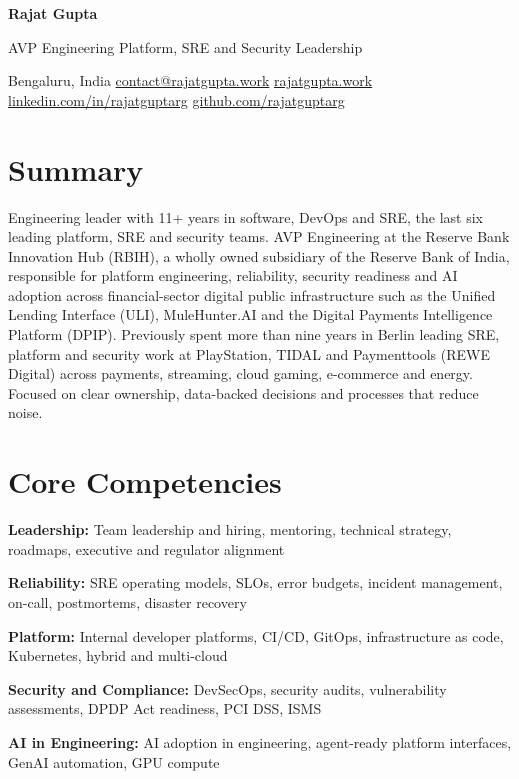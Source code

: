 \documentclass[10pt,a4paper]{article}
\newcommand{\skill}[2]{\textbf{#1:} #2\par\addvspace{0.25ex}}
\begin{document}
\begin{center}
  {\fontsize{24}{28}\selectfont\bfseries Rajat Gupta}\par\addvspace{0.6ex}
  {\large AVP Engineering \textbar{} Platform, SRE and Security Leadership}\par\addvspace{0.7ex}
  {\small
    Bengaluru, India \textbar{}
    \href{mailto:contact@rajatgupta.work}{contact@rajatgupta.work} \textbar{}
    \href{https://rajatgupta.work}{rajatgupta.work} \textbar{}
    \href{https://www.linkedin.com/in/rajatguptarg/}{linkedin.com/in/rajatguptarg} \textbar{}
    \href{https://github.com/rajatguptarg}{github.com/rajatguptarg}\par}
\end{center}

\section{Summary}
Engineering leader with 11+ years in software, DevOps and SRE, the last six leading platform, SRE and security teams.
AVP Engineering at the Reserve Bank Innovation Hub (RBIH), a wholly owned subsidiary of the Reserve Bank of India, responsible for platform engineering, reliability, security readiness and AI adoption across financial-sector digital public infrastructure such as the Unified Lending Interface (ULI), MuleHunter.AI and the Digital Payments Intelligence Platform (DPIP).
Previously spent more than nine years in Berlin leading SRE, platform and security work at PlayStation, TIDAL and Paymenttools (REWE Digital) across payments, streaming, cloud gaming, e-commerce and energy.
Focused on clear ownership, data-backed decisions and processes that reduce noise.

\section{Core Competencies}
\skill{Leadership}{Team leadership and hiring, mentoring, technical strategy, roadmaps, executive and regulator alignment}
\skill{Reliability}{SRE operating models, SLOs, error budgets, incident management, on-call, postmortems, disaster recovery}
\skill{Platform}{Internal developer platforms, CI/CD, GitOps, infrastructure as code, Kubernetes, hybrid and multi-cloud}
\skill{Security and Compliance}{DevSecOps, security audits, vulnerability assessments, DPDP Act readiness, PCI DSS, ISMS}
\skill{AI in Engineering}{AI adoption in engineering, agent-ready platform interfaces, GenAI automation, GPU compute}
\end{document}
